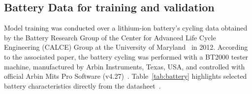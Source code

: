 \subsection{Battery Data for training and validation} \label{subsec:b_data}
%
Model training was conducted over a lithium-ion battery's cycling data obtained by the Battery Research Group of the Center for Advanced Life Cycle Engineering (CALCE) Group at the University of Maryland~\cite{noauthor_calce_2017} in 2012.
According to the associated paper, the battery cycling was performed with a BT2000 tester machine, manufactured by Arbin Instruments, Texas, USA, and controlled with official Arbin Mits Pro Software (v4.27)~\cite{xing_state_2014}.
Table~\ref{tab:battery} highlights selected battery characteristics directly from the datasheet~\cite{noauthor_anr26650m1a}.
